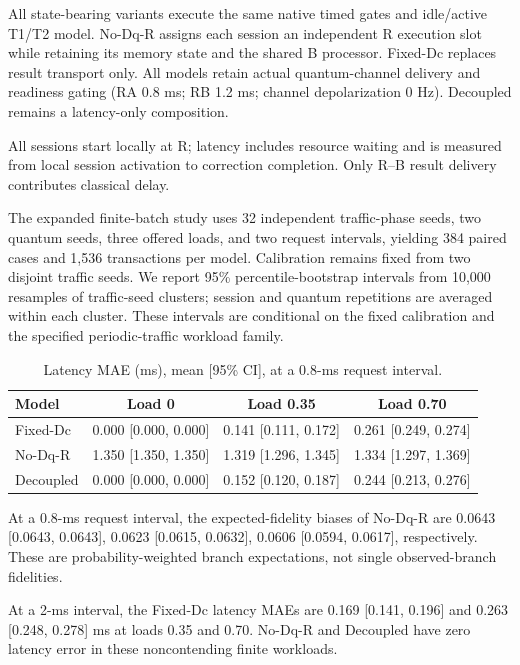 All state-bearing variants execute the same native timed gates and idle/active T1/T2 model. No-Dq-R assigns each session an independent R execution slot while retaining its memory state and the shared B processor. Fixed-Dc replaces result transport only. All models retain actual quantum-channel delivery and readiness gating (RA 0.8 ms; RB 1.2 ms; channel depolarization 0 Hz). Decoupled remains a latency-only composition.

All sessions start locally at R; latency includes resource waiting and is measured from local session activation to correction completion. Only R--B result delivery contributes classical delay.

The expanded finite-batch study uses 32 independent traffic-phase seeds,
two quantum seeds, three offered loads, and two request intervals, yielding
384 paired cases and 1,536 transactions per model. Calibration remains
fixed from two disjoint traffic seeds. We report 95\% percentile-bootstrap
intervals from 10,000 resamples of traffic-seed clusters; session and quantum
repetitions are averaged within each cluster. These intervals are conditional
on the fixed calibration and the specified periodic-traffic workload family.

\begin{table}[t]
\centering
\caption{Latency MAE (ms), mean [95\% CI], at a 0.8-ms request interval.}
\begin{tabular}{lccc}
\hline
Model & Load 0 & Load 0.35 & Load 0.70 \\
\hline
Fixed-Dc & 0.000 [0.000, 0.000] & 0.141 [0.111, 0.172] & 0.261 [0.249, 0.274] \\
No-Dq-R & 1.350 [1.350, 1.350] & 1.319 [1.296, 1.345] & 1.334 [1.297, 1.369] \\
Decoupled & 0.000 [0.000, 0.000] & 0.152 [0.120, 0.187] & 0.244 [0.213, 0.276] \\
\hline
\end{tabular}
\end{table}

At a 0.8-ms request interval, the expected-fidelity biases of No-Dq-R are 0.0643 [0.0643, 0.0643], 0.0623 [0.0615, 0.0632], 0.0606 [0.0594, 0.0617], respectively. These are probability-weighted branch expectations, not single observed-branch fidelities.

At a 2-ms interval, the Fixed-Dc latency MAEs are 0.169 [0.141, 0.196] and 0.263 [0.248, 0.278] ms at loads 0.35 and 0.70. No-Dq-R and Decoupled have zero latency error in these noncontending finite workloads.

